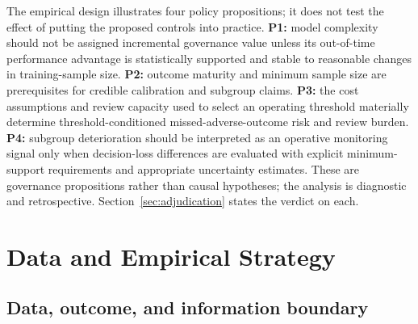 \documentclass[10pt]{article}
\begin{document}
The empirical design illustrates four policy propositions; it does not test the effect of putting the proposed controls into practice. \textbf{P1:} model complexity should not be assigned incremental governance value unless its out-of-time performance advantage is statistically supported and stable to reasonable changes in training-sample size. \textbf{P2:} outcome maturity and minimum sample size are prerequisites for credible calibration and subgroup claims. \textbf{P3:} the cost assumptions and review capacity used to select an operating threshold materially determine threshold-conditioned missed-adverse-outcome risk and review burden. \textbf{P4:} subgroup deterioration should be interpreted as an operative monitoring signal only when decision-loss differences are evaluated with explicit minimum-support requirements and appropriate uncertainty estimates. These are governance propositions rather than causal hypotheses; the analysis is diagnostic and retrospective. Section~\ref{sec:adjudication} states the verdict on each.

\section{Data and Empirical Strategy}

\subsection{Data, outcome, and information boundary}
\end{document}
